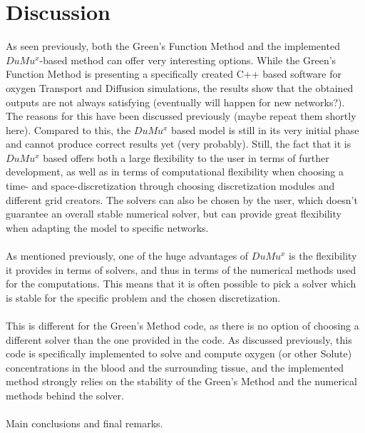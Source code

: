 \newpage
\section{Discussion}

As seen previously, both the Green's Function Method and the implemented $DuMu^x$-based method can offer very interesting options. While the Green's Function Method is presenting a specifically created C++ based software for oxygen Transport and Diffusion simulations, the results show that the obtained outputs are not always satisfying (eventually will happen for new networks?). The reasons for this have been discussed previously (maybe repeat them shortly here).
Compared to this, the $DuMu^x$ based model is still in its very initial phase and cannot produce correct results yet (very probably). Still, the fact that it is $DuMu^x$ based offers both a large flexibility to the user in terms of further development, as well as in terms of computational flexibility when choosing a time- and space-discretization through choosing discretization modules and different grid creators. The solvers can also be chosen by the user, which doesn't guarantee an overall stable numerical solver, but can provide great flexibility when adapting the model to specific networks.
\\
\\As mentioned previously, one of the huge advantages of $DuMu^x$ is the flexibility it provides in terms of solvers, and thus in terms of the numerical methods used for the computations. This means that it is often possible to pick a solver which is stable for the specific problem and the chosen discretization.
\\
\\This is different for the Green's Method code, as there is no option of choosing a different solver than the one provided in the code. As discussed previously, this code is specifically implemented to solve and compute oxygen (or other Solute) concentrations in the blood and the surrounding tissue, and the implemented method strongly relies on the stability of the Green's Method and the numerical methods behind the solver.
\\
\\Main conclusions and final remarks.